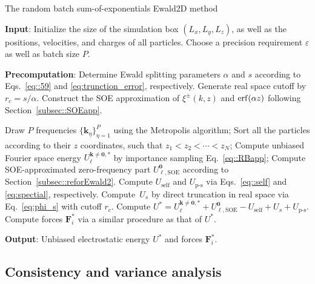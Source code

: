 \begin{algorithm}[ht] 
	\caption{The random batch sum-of-exponentials Ewald2D method}
	\begin{algorithmic}[1]
		
		\State \textbf{Input}: Initialize the size of the simulation box $(L_x,L_y, L_z)$, as well as the positions, velocities, and charges of all particles. Choose a precision requirement $\varepsilon$ as well as batch size $P$.
		
		\State \textbf{Precomputation}: Determine Ewald splitting parameters $\alpha$ and $s$ according to Eqs.~\eqref{eq::59} and \eqref{eq:trunction_error}, respectively. Generate real space cutoff by $r_c=s/\alpha$. Construct the SOE approximation of $\xi^{\pm}(k,z)$ and $\operatorname{erf}(\alpha z)$ following Section~\ref{subsec::SOEapp}.
		
		\Procedure{}       
		\State Draw $P$ frequencies $\{\bm{k}_{\eta}\}_{\eta=1}^{P}$ using the Metropolis algorithm;
		\State Sort all the particles according to their $z$ coordinates, such that $z_1 < z_2 < \cdots < z_N$;
		\State Compute unbiased Fourier space energy $U_{\ell}^{\bm{k}\neq\bm{0},*}$ by importance sampling Eq.~\eqref{eq::RBapp};
		\State Compute SOE-approximated zero-frequency part $U_{\ell,\text{SOE}}^{\bm{0}}$ according to Section~\ref{subsec::reforEwald2}.
		\State Compute $U_{\text{self}}$ and $U_{\text{p-s}}$ via Eqs.~\eqref{eq::self} and \eqref{eq:spectial}, respectively.
		\State Compute~$U_{s}$ by direct truncation in real space via Eq.~\eqref{eq:phi_s} with cutoff $r_c$. %
		\State Compute $U^{*}=U_{\ell}^{\bm{k}\neq\bm{0},*}+U_{\ell,\text{SOE}}^{\bm{0}}-U_{\text{self}}+U_{s}+U_{\text{p-s}}$.
		\State Compute forces $\bm{F}_{i}^{*}$ via a similar procedure as that of $U^{*}$.
		\EndProcedure
		
		\State \textbf{Output}: Unbiased electrostatic energy $U^{*}$ and forces $\bm{F}_{i}^{*}$.
		
	\end{algorithmic}\label{alg:RBSE2D}
\end{algorithm}



\subsection{Consistency and variance analysis}
\label{subsec::consis}

